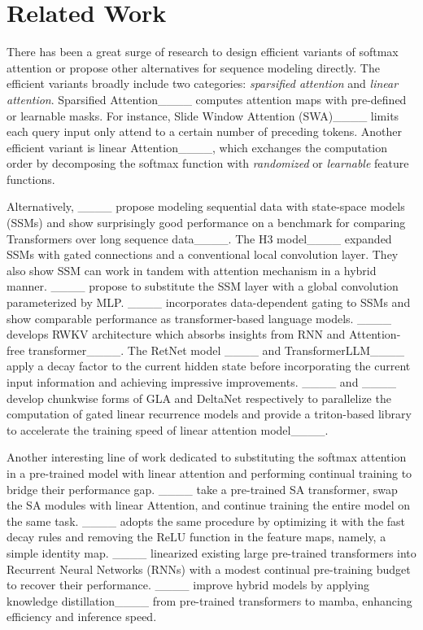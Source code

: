 \section{Related Work}
There has been a great surge of research to design efficient variants of softmax attention or propose other alternatives for sequence modeling directly. The efficient variants broadly include two categories: \textit{sparsified attention} and \textit{linear attention}. {Sparsified Attention}____ computes attention maps with pre-defined or learnable masks. For instance, Slide Window Attention (SWA)____ limits each query input only attend to a certain number of preceding tokens. Another efficient variant is linear Attention____, which exchanges the computation order by decomposing the softmax function with \textit{randomized} or \textit{learnable} feature functions. 

Alternatively, ____ propose modeling sequential data with state-space models (SSMs) and show surprisingly good performance on a benchmark for comparing Transformers over long sequence data____. The H3 model____ expanded SSMs with gated connections and a conventional local convolution layer. They also show SSM can work in tandem with attention mechanism in a hybrid manner.  ____ propose to substitute the SSM layer with a global convolution parameterized by MLP. ____ incorporates data-dependent gating to SSMs and show comparable performance as transformer-based language models. ____ develops RWKV architecture which absorbs insights from RNN and Attention-free transformer____. The RetNet model ____ and TransformerLLM____ apply a decay factor to the current hidden state before incorporating the current input information and achieving impressive improvements. ____ and ____ develop chunkwise forms of GLA and DeltaNet respectively to parallelize the computation of gated linear recurrence models and provide a triton-based library to accelerate the training speed of linear attention model____.

Another interesting line of work dedicated to substituting the softmax attention in a pre-trained model with linear attention and performing continual training to bridge their performance gap. ____ take a pre-trained SA transformer, swap the SA modules with linear Attention, and continue training the entire model on the same task. ____ adopts the same procedure by optimizing it with the fast decay rules and removing the $\text{ReLU}$ function in the feature maps, namely, a simple identity map. ____ linearized existing large pre-trained transformers into Recurrent Neural Networks (RNNs) with a modest continual pre-training budget to recover their performance. ____ improve hybrid models by applying knowledge distillation____ from pre-trained transformers to mamba, enhancing efficiency and inference speed.